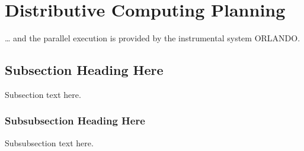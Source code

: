 \documentclass[conference,a4paper]{IEEEtran}
\begin{document}
\section{Distributive Computing Planning}
\label{sec:distr}

\ldots{} and the parallel execution is provided by the instrumental system ORLANDO.


\subsection{Subsection Heading Here}
Subsection text here.


\subsubsection{Subsubsection Heading Here}
Subsubsection text here.


%
%

\end{document}
